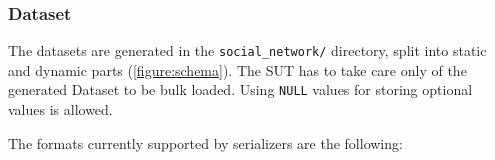 








\subsubsection{Dataset}

The datasets are generated in the \texttt{social\_network/} directory, split into static and dynamic parts (\autoref{figure:schema}).
The SUT has to take care only of the generated Dataset to be bulk loaded. Using \texttt{NULL} values for storing optional values is allowed.

The formats currently supported by \datagen serializers are the following:


